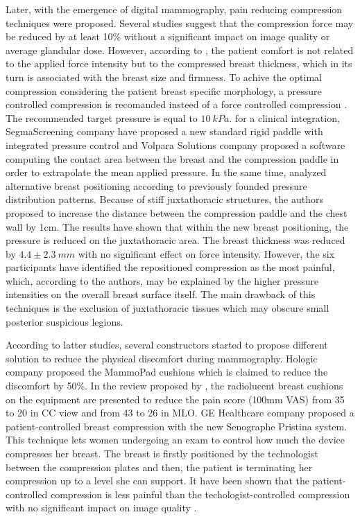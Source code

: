 Later, with the emergence of digital mammography, pain reducing compression techniques were proposed. Several studies \citep{chida_reduced_2009,saunders_effect_2008} suggest that the compression force may be reduced by at least 10\% without a significant impact on image quality or average glandular dose. However, according to \cite{poulos_breast_2003}, the patient comfort is not related to the applied force intensity but to the compressed breast thickness, which in its turn is associated with the breast size and firmness. To achive the optimal compression considering the patient breast specific morphology, a pressure controlled compression is recomanded insteed of a force controlled compression \citep{de_pain_2015}. The recommended target pressure is equal to $10\ kPa$. for a clinical integration, SegmaScreening company have proposed a new standard rigid paddle with integrated pressure control and Volpara Solutions company proposed a software computing the contact area between the breast and the compression paddle in order to extrapolate the mean applied pressure.  In the same time, \cite{dustler_effect_2012} analyzed alternative breast positioning according to previously founded pressure distribution patterns. Because of stiff juxtathoracic structures, the authors proposed to increase the distance between the compression paddle and the chest wall by 1cm. The results have shown that within the new breast positioning, the pressure is reduced on the juxtathoracic area. The breast thickness was reduced by $4.4\pm2.3 \ mm$ with no significant effect on force intensity. However, the six participants have identified the repositioned compression as the most painful, which, according to the authors, may be explained by the higher pressure intensities on the overall breast surface itself.  The main drawback of this techniques is the exclusion of juxtathoracic tissues which may obscure small posterior suspicious legions. 
 
According to latter studies, several constructors started to propose different solution to reduce the physical discomfort during mammography. Hologic company proposed the MammoPad cushions which is claimed to reduce the discomfort by 50\%. In the review proposed by \cite{miller_interventions_2008}, the radiolucent breast cushions on the equipment are presented to reduce the pain score (100mm VAS) from 35 to 20 in CC view and from 43 to 26 in MLO. GE Healthcare company proposed a patient-controlled breast compression with the new Senographe Pristina system. This technique lets women undergoing an exam to control how much the device compresses her breast.  The breast is firstly positioned by the technologist between the compression plates and then, the patient is terminating her compression up to a level she can support. It have been shown that the patient-controlled compression is less painful than the techologist-controlled compression with no significant impact on image quality  \citep{miller_interventions_2008}.

